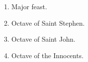 		\begin{enumerate}
			\item {} Major feast.
			\item Octave of Saint Stephen. 
			\item Octave of Saint John. 
			\item Octave of the Innocents. 
		\end{enumerate}